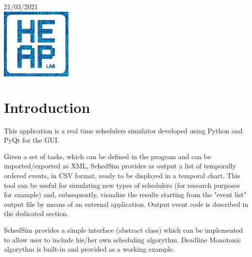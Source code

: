 \begin{titlepage}

{\large 21/03/2021}\\[2cm] %


\includegraphics[width=100pt]{heaplogo.pdf}\\[1cm] %
 

\vfill %

\end{titlepage}

\section{Introduction}

This application is a real time schedulers simulator developed using Python and PyQt for the GUI.

Given a set of tasks, which can be defined in the program and can be imported/exported as XML, SchedSim provides as output a list of temporally ordered events, in CSV format, ready to be displayed in a temporal chart. This tool can be useful for simulating new types of schedulers (for research purposes for example) and, subsequently, visualize the results starting from the "event list" output file by means of an external application.
\newline
Output event code is described in the dedicated section. 
\par SchedSim provides a simple interface (abstract class) which can be implemented to allow user to include his/her own scheduling algorythm. Deadline Monotonic algorythm is built-in and provided as a working example. 

